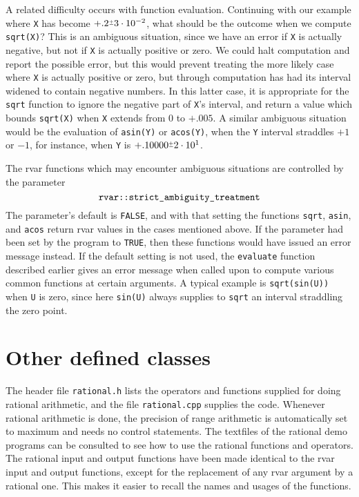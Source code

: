 A related difficulty occurs with function evaluation. Continuing with
our example where {\tt X} has become $+.2\pms3\cdot 10^{-2}$,
what should be the outcome when we compute {\tt sqrt(X)}? This is
an ambiguous situation, since we have an error if {\tt X} is actually
negative, but not if {\tt X} is actually positive or zero. We could
halt computation and report the possible error, but this would prevent
treating the more likely case where {\tt X} is actually positive or zero,
but through computation has had its interval widened to contain
negative numbers. In this latter case, it is appropriate for the {\tt sqrt}
function to ignore the negative part of {\tt X}'s interval,
and return a value which bounds {\tt sqrt(X)} when {\tt X}
extends from $0$ to $+.005$. A similar ambiguous situation would be
the evaluation of {\tt asin(Y)} or {\tt acos(Y)}, when the {\tt Y}
interval straddles $+1$ or $-1$, for instance, when {\tt Y} is
$+.10000\pms2\cdot 10^{1}$. 

The rvar functions which may encounter ambiguous situations are controlled
by the parameter
$$\hbox{\tt rvar::strict\_ambiguity\_treatment}$$
The parameter's default is {\tt FALSE}, and with that setting the functions
{\tt sqrt}, {\tt asin}, and {\tt acos} return rvar values in the cases
mentioned above.
If the parameter had been set by the program to {\tt TRUE}, then 
these functions would have issued an error message instead.
If the default setting is not used, the {\tt evaluate} function
described earlier gives an error message when called upon to compute 
various common functions at certain arguments. A typical example is
{\tt sqrt(sin(U))} when {\tt U} is zero, since here {\tt sin(U)}
always supplies to {\tt sqrt} an interval straddling the zero point.

\section{Other defined classes}
The header file {\tt rational.h} lists the operators and functions supplied
for doing rational arithmetic, and the file {\tt rational.cpp} supplies
the code. Whenever rational arithmetic is done, the precision of
range arithmetic is automatically set to maximum and needs no control
statements. The textfiles of the rational demo programs
can be consulted to see how to use the rational
functions and operators. The rational input and output functions have been
made identical to the rvar input and output functions, except for
the replacement of any rvar argument by a rational one. This makes it
easier to recall the names and usages of the functions.

